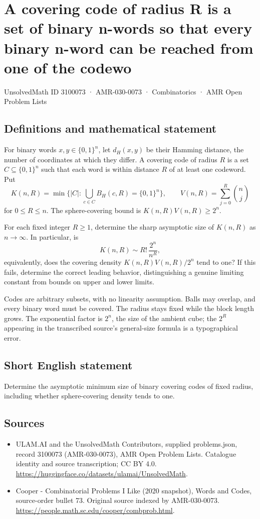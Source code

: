 \documentclass[11pt,a4paper]{article}
\begin{document}
\section*{A covering code of radius R is a set of binary n-words so that every binary n-word can be reached from one of the codewo}\label{3100073}
{\small UnsolvedMath ID 3100073 · AMR-030-0073 · Combinatorics · AMR Open Problem Lists}
\subsection{Definitions and mathematical statement}
For binary words $x,y\in\{0,1\}^n$, let $d_H(x,y)$ be their
Hamming distance, the number of coordinates at which they differ.
A covering code of radius $R$ is a set $C\subseteq\{0,1\}^n$
such that each word is within distance $R$ of at least one
codeword. Put
\[
 K(n,R)=\min\{|C|:\bigcup_{c\in C}B_H(c,R)=\{0,1\}^n\},
 \qquad V(n,R)=\sum_{j=0}^R\binom nj
\]
for $0\le R\le n$. The sphere-covering bound is
$K(n,R)V(n,R)\ge2^n$.

For each fixed integer $R\ge1$, determine the sharp asymptotic
size of $K(n,R)$ as $n\to\infty$. In particular, is
\[
                     K(n,R)\sim R!\,\frac{2^n}{n^R},
\]
equivalently, does the covering density
$K(n,R)V(n,R)/2^n$ tend to one? If this fails, determine the
correct leading behavior, distinguishing a genuine limiting
constant from bounds on upper and lower limits.

Codes are arbitrary subsets, with no linearity assumption.
Balls may overlap, and every binary word must be covered.
The radius stays fixed while the block length grows. The
exponential factor is $2^n$, the size of the ambient cube;
the $2^R$ appearing in the transcribed source's general-size
formula is a typographical error.
\subsection{Short English statement}
Determine the asymptotic minimum size of binary covering codes of fixed radius, including whether sphere-covering density tends to one.
\subsection{Sources}
\begin{itemize}
\item[S1] ULAM.AI and the UnsolvedMath Contributors, supplied problems.json, record 3100073 (AMR-030-0073), AMR Open Problem Lists. Catalogue identity and source transcription; CC BY 4.0.
\url{https://huggingface.co/datasets/ulamai/UnsolvedMath}.
\item[S2] Cooper - Combinatorial Problems I Like (2020 snapshot), Words and Codes, source-order bullet 73. Original source indexed by AMR-030-0073.
\url{https://people.math.sc.edu/cooper/combprob.html}.
\end{itemize}
\end{document}
